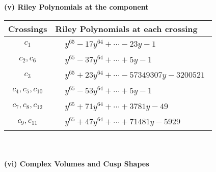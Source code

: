 \documentclass[1p]{elsarticle_modified}
\theoremstyle{definition}
\begin{document}
\newpage\renewcommand{\arraystretch}{1}
\flushleft \textbf{(v) Riley Polynomials at the component}\newline \\
\begin{tabular}{m{50pt}|m{274pt}}
Crossings & \hspace{64pt}Riley Polynomials at each crossing \\
\hline $$\begin{aligned}c_{1}\end{aligned}$$&$\begin{aligned}
&y^{65}-17 y^{64}+\cdots-23 y-1
\end{aligned}$\\
\hline $$\begin{aligned}c_{2},c_{6}\end{aligned}$$&$\begin{aligned}
&y^{65}-37 y^{64}+\cdots+5 y-1
\end{aligned}$\\
\hline $$\begin{aligned}c_{3}\end{aligned}$$&$\begin{aligned}
&y^{65}+23 y^{64}+\cdots-57349307 y-3200521
\end{aligned}$\\
\hline $$\begin{aligned}c_{4},c_{5},c_{10}\end{aligned}$$&$\begin{aligned}
&y^{65}-53 y^{64}+\cdots+5 y-1
\end{aligned}$\\
\hline $$\begin{aligned}c_{7},c_{8},c_{12}\end{aligned}$$&$\begin{aligned}
&y^{65}+71 y^{64}+\cdots+3781 y-49
\end{aligned}$\\
\hline $$\begin{aligned}c_{9},c_{11}\end{aligned}$$&$\begin{aligned}
&y^{65}+47 y^{64}+\cdots+71481 y-5929
\end{aligned}$\\
\hline
\end{tabular}\\~\\
\newpage\flushleft \textbf{(vi) Complex Volumes and Cusp Shapes}
\end{document}

